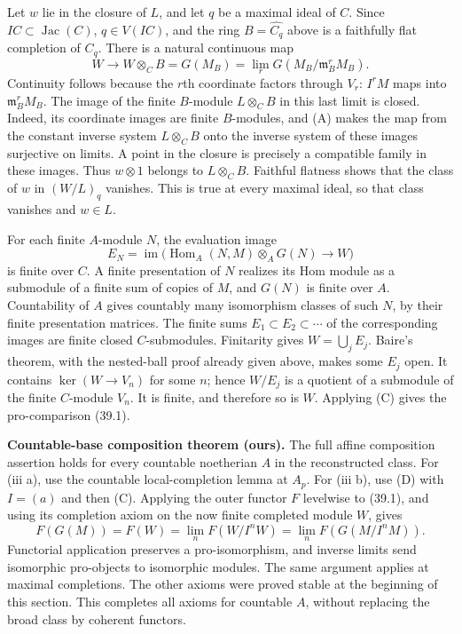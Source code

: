 Let $w$ lie in the closure of $L$, and let $q$ be a maximal ideal of
$C$. Since $IC\subset\operatorname{Jac}(C)$, $q\in V(IC)$, and
the ring $B=\widehat{C_q}$ above is a faithfully flat completion of
$C_q$. There is a natural continuous map
\[
 W\longrightarrow W\otimes_C B
 =G(M_B)=\lim_r G(M_B/\mathfrak m_B^rM_B).
\]
Continuity follows because the $r$th coordinate factors through $V_r$:
$I^rM$ maps into $\mathfrak m_B^rM_B$. The image of the finite
$B$-module $L\otimes_C B$ in this last limit is closed. Indeed, its
coordinate images are finite $B$-modules, and (A) makes the map from
the constant inverse system $L\otimes_C B$ onto the inverse system
of these images surjective on limits. A point in the closure is
precisely a compatible family in these images. Thus $w\otimes1$
belongs to $L\otimes_C B$. Faithful flatness shows that the class
of $w$ in $(W/L)_q$ vanishes. This is true at every maximal ideal,
so that class vanishes and $w\in L$.

For each finite $A$-module $N$, the evaluation image
\[
 E_N=\operatorname{im}\bigl(\operatorname{Hom}_A(N,M)
              \otimes_A G(N)\longrightarrow W\bigr)
\]
is finite over $C$. A finite presentation of $N$ realizes its Hom
module as a submodule of a finite sum of copies of $M$, and $G(N)$
is finite over $A$. Countability of $A$ gives countably many
isomorphism classes of such $N$, by their finite presentation matrices.
The finite sums $E_1\subset E_2\subset\cdots$ of the corresponding
images are finite closed $C$-submodules. Finitarity gives
$W=\bigcup_j E_j$. Baire's theorem, with the nested-ball proof already
given above, makes some $E_j$ open. It contains $\ker(W\to V_n)$
for some $n$; hence $W/E_j$ is a quotient of a submodule of the
finite $C$-module $V_n$. It is finite, and therefore so is $W$.
Applying (C) gives the pro-comparison (39.1).

\textbf{Countable-base composition theorem (ours).}
The full affine composition assertion holds for every countable
noetherian $A$ in the reconstructed class. For (iii a), use the
countable local-completion lemma at $A_p$. For (iii b), use (D)
with $I=(a)$ and then (C). Applying the outer functor $F$ levelwise
to (39.1), and using its completion axiom on the now finite completed
module $W$, gives
\[
 F(G(M))=F(W)=\lim_n F(W/I^nW)
          =\lim_n F(G(M/I^nM)).
\]
Functorial application preserves a pro-isomorphism, and inverse limits
send isomorphic pro-objects to isomorphic modules. The same argument
applies at maximal completions. The other axioms were proved stable
at the beginning of this section. This completes all axioms for
countable $A$, without replacing the broad class by coherent functors.

